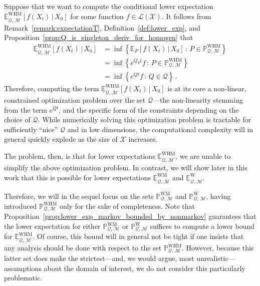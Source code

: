 \documentclass[10pt,a4paper]{paper}
\theoremstyle{definition}
\newtheorem{exmp}{Example}%
\newcommand{\states}{\mathcal{X}}
\newcommand{\processes}{\mathbb{P}}
\newcommand{\wprocesses}{\processes^{\mathrm{W}}}
\newcommand{\wmprocesses}{\processes^{\mathrm{WM}}}
\newcommand{\whmprocesses}{\processes^{\mathrm{WHM}}}
\newcommand{\gambles}{\mathcal{L}}
\newcommand{\gamblesX}{\gambles(\states)}
\newcommand{\rateset}{\mathcal{Q}}
\newcommand{\exampleend}{\hfill$\Diamond$}
\begin{document}

Suppose that we want to compute the conditional lower expectation $\underline{\mathbb{E}}_{\rateset,\,\mathcal{M}}^{\mathrm{WHM}}[f(X_t)\,\vert\,X_0]$ for some function $f\in\gamblesX$. It follows from Remark~\ref{remark:expectationT}, Definition~\ref{def:lower_exp}, and Proposition~\ref{prop:Q_is_singleton_deriv_for_homogen} that
\begin{align*}
\underline{\mathbb{E}}_{\rateset,\,\mathcal{M}}^{\mathrm{WHM}}[f(X_t)\,\vert\,X_0] &= \inf\left\{ \mathbb{E}_P[f(X_t)\,\vert\,X_0]\,:\,P\in\whmprocesses_{\rateset,\,\mathcal{M}} \right\} \\
 &= \inf\left\{ e^{Q_P t}f\,:\,P\in\whmprocesses_{\rateset,\,\mathcal{M}} \right\} \\
 &= \inf\left\{ e^{Q t}f\,:\,Q\in\rateset\right\}\,.
\end{align*}
Therefore, computing the term $\underline{\mathbb{E}}_{\rateset,\,\mathcal{M}}^{\mathrm{WHM}}[f(X_t)\,\vert\,X_0]$ is at its core a non-linear, constrained optimization problem over the set $\rateset$---the non-linearity stemming from the term $e^{Qt}$, and the specific form of the constraints depending on the choice of $\rateset$. While numerically solving this optimization problem is tractable for sufficiently ``nice'' $\rateset$ and in low dimensions, the computational complexity will in general quickly explode as the size of $\states$ increases.

The problem, then, is that for lower expectations $\underline{\mathbb{E}}_{\rateset,\,\mathcal{M}}^{\mathrm{WHM}}$, we are unable to simplify the above optimization problem. In contrast, we will show later in this work that this is possible for lower expectations $\underline{\mathbb{E}}_{\rateset,\,\mathcal{M}}^{\mathrm{WM}}$ and $\underline{\mathbb{E}}_{\rateset,\,\mathcal{M}}^{\mathrm{W}}$.

Therefore, we will in the sequel focus on the sets $\wmprocesses_{\rateset,\,\mathcal{M}}$ and $\wprocesses_{\rateset,\,\mathcal{M}}$, having introduced $\whmprocesses_{\rateset,\,\mathcal{M}}$ only for the sake of completeness. Note that Proposition~\ref{prop:lower_exp_markov_bounded_by_nonmarkov} guarantees that the lower expectation for either $\wmprocesses_{\rateset,\,\mathcal{M}}$ or $\wprocesses_{\rateset,\,\mathcal{M}}$ suffices to compute a lower bound for $\underline{\mathbb{E}}_{\rateset,\,\mathcal{M}}^\mathrm{WHM}$. Of course, this bound will in general not be tight if one insists that any analysis should be done with respect to the set $\whmprocesses_{\rateset,\,\mathcal{M}}$. However, because this latter set does make the strictest---and, we would argue, most unrealistic---assumptions about the domain of interest, we do not consider this particularly problematic.
\end{document}
